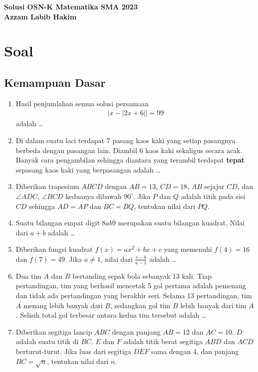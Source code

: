 \begin{center}
    \textbf{\Huge Solusi OSN-K Matematika SMA 2023}\\
    \textbf{\large Azzam Labib Hakim}
\end{center}

%
\vspace{-1.5cm}
\section{Soal}
\subsection{Kemampuan Dasar}
\begin{enumerate}
\item Hasil penjumlahan semua solusi persamaan
\begin{align*}
|x-|2x+6||=99
\end{align*}
adalah \dots

\item Di dalam suatu laci terdapat 7 pasang kaos kaki yang setiap pasangnya berbeda dengan pasangan lain. Diambil 6 kaos kaki sekaligus secara acak. Banyak cara pengambilan sehingga diantara yang terambil terdapat \textbf{tepat} sepasang kaos kaki yang berpasangan adalah \dots

\item Diberikan trapesium $ABCD$ dengan $AB = 13$, $CD = 18$, $AB$ sejajar $CD$,
dan $\angle ADC$, $\angle BCD$ keduanya dibawah $90^\circ$. Jika $P$ dan $Q$ adalah titik pada sisi $CD$ sehingga $AD = AP$ dan $BC = BQ$, tentukan nilai dari $PQ$.

\item Suatu bilangan empat digit $8ab9$ merupakan suatu bilangan kuadrat. Nilai dari $a+b$ adalah \dots

\item Diberikan fungsi kuadrat  $f(x) = ax^2+bx+c$ yang memenuhi $f(4)=16$ dan $f(7)=49$. Jika $a \neq 1$, nilai dari $\frac{c-b}{a-1}$ adalah \dots

\item Dua tim $A$ dan $B$ bertanding sepak bola sebanyak 13 kali. Tiap pertandingan, tim yang berhasil mencetak 5 gol pertama adalah pemenang dan tidak ada pertandingan yang berakhir seri. Selama 13 pertandingan, tim $A$ menang lebih banyak dari $B$, sedangkan gol tim $B$ lebih banyak dari tim $A$. Selisih total gol terbesar antara kedua tim tersebut adalah \dots

\item Diberikan segitiga lancip $ABC$ dengan panjang $AB = 12$ dan $AC = 10$. $D$ adalah suatu titik di $BC$. $E$ dan $F$ adalah titik berat segitiga $ABD$ dan $ACD$ berturut-turut. Jika luas dari segitiga $DEF$ sama dengan 4, dan panjang $BC = \sqrt{n}$, tentukan nilai dari $n$.


\end{enumerate}
